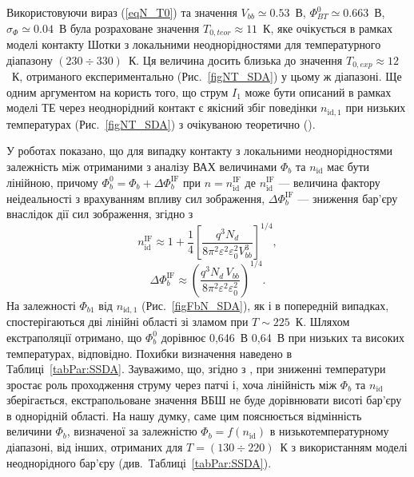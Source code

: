 Використовуючи вираз (\ref{eqN_T0}) та значення $V_{bb}\simeq0.53$~В, $\Phi_{B\!T}^0\simeq0.663$~В, $\sigma_\Phi\simeq0.04$~В
була розраховане значення $T_{0,teor}\approx11$~К, яке очікується в рамках моделі контакту Шотки з локальними неоднорідностями
для температурного діапазону $(230\div330)$~К.
Ця величина досить близька до значення $T_{0,exp}\approx12$~К, отриманого експериментально (Рис.~\ref{figNT_SDA}) у цьому ж діапазоні.
Ще одним аргументом на користь того, що струм $I_1$ може бути описаний в рамках моделі ТЕ через неоднорідний контакт є якісний збіг
поведінки $n_{\mathrm{id},1}$ при низьких температурах (Рис.~\ref{figNT_SDA}) з очікуваною теоретично (\cite[Fig.11(b)]{Tung:PhysRev}).


У роботах  \cite{Tung:PhysRev,Sarpatwari,Schmitsdorf} показано, що для випадку
контакту з локальними неоднорідностями залежність між отриманими з аналізу ВАХ величинами $\Phi_b$ та $n_\mathrm{id}$ має бути лінійною,
причому $\Phi_{b}^0=\Phi_{b}+\Delta\Phi_b^\mathrm{IF}$ при $n=n_\mathrm{id}^\mathrm{IF}$
де $n_\mathrm{id}^\mathrm{IF}$ ---  величина фактору неідеальності з врахуванням впливу сил зображення,
$\Delta\Phi_b^\mathrm{IF}$ --- зниження бар'єру внаслідок дії сил зображення,
згідно з \cite{Sarpatwari}
\begin{equation}\label{eqN:IF}
n_\mathrm{id}^\mathrm{IF}\approx 1+\frac14\left[\frac{q^3N_d}{8\pi^2\varepsilon^2\varepsilon_0^2V^3_{bb}}\right]^{1/4},
\end{equation}
\begin{equation}\label{eqFb:IF}
\Delta\Phi_b^\mathrm{IF}\approx \left(\frac{q^3N_d\,V_{bb}}{8\pi^2\varepsilon^2\varepsilon_0^2}\right)^{1/4}.
\end{equation}
На залежності $\Phi_{b1}$ від $n_{\mathrm{id},1}$ (Рис.~\ref{figFbN_SDA}), як і в попередній випадках,
спостерігаються дві лінійні області зі зламом при $T\sim225$~К.
Шляхом екстраполяції отримано, що $\Phi_b^0$ дорівнює 0,646~В 0,64~В при низьких та високих температурах, відповідно.
Похибки визначення наведено в Таблиці~\ref{tabPar:SSDA}.
Зауважимо, що, згідно з \cite{Sarpatwari,Schmitsdorf},
при зниженні температури зростає роль проходження струму через патчі і, хоча лінійність між  $\Phi_b$ та $n_\mathrm{id}$ зберігається,
екстрапольоване значення ВБШ не буде дорівнювати висоті бар'єру в однорідній області.
На нашу думку, саме цим пояснюється відмінність величини $\Phi_b$, визначеної за залежністю
$\Phi_b=f(n_\mathrm{id})$ в низькотемпературному діапазоні, від інших,
отриманих для $T=(130\div220)$~К з використанням моделі неоднорідного бар'єру (див.~Таблиці~\ref{tabPar:SSDA}).

